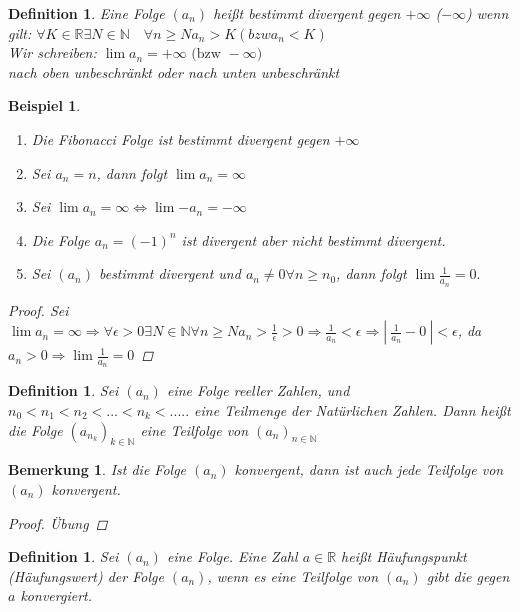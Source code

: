 \documentclass[a4paper,titlepage,oneside]{article}
\def\N{\ensuremath{\mathbb{N}} }
\def\R{\ensuremath{\mathbb{R}} }
\newcommand{\abs}[1]{\ensuremath{\left|\:#1\:\right|}}
\theoremstyle{thmstyle}
\newtheorem{defi}[satz]{Definition}
\newtheorem{bsp}[satz]{Beispiel}
\newtheorem{bem}[satz]{Bemerkung}
\begin{document}
\begin{defi}
Eine Folge $(a_n)$ heißt bestimmt divergent gegen $+ \infty $ ($- \infty$) wenn gilt:
$\forall K \in \R \exists N \in \N \quad \forall n \ge N a_n > K (bzw a_n < K)$\\
Wir schreiben: $\lim{a_n} = +\infty \text{ (bzw }-\infty)$\\
nach oben unbeschränkt oder nach unten unbeschränkt
\end{defi}

\begin{bsp}
\begin{enumerate}
\item Die Fibonacci Folge ist bestimmt divergent gegen $+ \infty$
\item Sei $a_n = n$, dann folgt $\lim{a_n} = \infty$
\item Sei $\lim{a_n} = \infty \Leftrightarrow \lim{-a_n} = - \infty$
\item Die Folge $a_n = (-1)^n$ ist divergent aber nicht bestimmt divergent.
\item Sei $(a_n)$ bestimmt divergent und $a_n \ne 0 \forall n \ge n_0$, dann folgt $\lim{\frac{1}{a_n}} = 0.$
\end{enumerate}
\begin{proof}
Sei $\lim{a_n} = \infty \Rightarrow \forall \epsilon > 0 \exists N \in \N \forall n \ge N
a_n > \frac{1}{\epsilon} > 0 \Rightarrow \frac{1}{a_n} < \epsilon \Rightarrow \abs{\frac{1}{a_n} - 0} < \epsilon$, da $a_n > 0 \Rightarrow \lim{\frac{1}{a_n}} = 0$
\end{proof}
\end{bsp}


\begin{defi}
Sei $(a_n)$ eine Folge reeller Zahlen, und $n_0 < n_1 < n_2 <... < n_k < .....$ eine Teilmenge der Natürlichen Zahlen.
Dann heißt die Folge $(a_{n_k})_{k\in\N}$ eine Teilfolge von $(a_n)_{n\in\N}$
\end{defi}

\begin{bem}
Ist die Folge $(a_n)$ konvergent, dann ist auch jede Teilfolge von $(a_n)$ konvergent.
\begin{proof} Übung
\end{proof}
\end{bem}

\begin{defi}
Sei $(a_n)$ eine Folge. Eine Zahl $a \in \R$ heißt Häufungspunkt (Häufungswert) der Folge $(a_n)$, wenn es eine Teilfolge von $(a_n)$ gibt die gegen $a$ konvergiert.
\end{defi}
\end{document}
